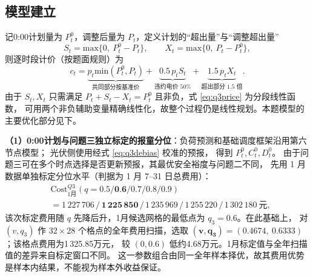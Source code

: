 \documentclass[withoutpreface,bwprint]{cumcmthesis}
\begin{document}
\subsection{模型建立}

记0:00计划量为 $P^0_t$，调整后量为 $P_t$，定义计划的“超出量”与“调整超出量”
\begin{equation}
S_t=\text{max}\{0,\ P^0_t-P_t\},\qquad X_t=\text{max}\{0,\ P_t-P^0_t\},
\label{eq:SX}
\end{equation}
则逐时段计价（按题面规则）为
\begin{equation}
c_t=\underbrace{p_t\text{min}(P^0_t,P_t)}_{\text{共同部分按基准价}}
+\underbrace{0.5\,p_t S_t}_{\text{违约电价 50\%}}
+\underbrace{1.5\,p_t X_t}_{\text{超出部分 1.5 倍}} .
\label{eq:q3price}
\end{equation}
由于 $S_t,X_t$ 只需满足 $P_t+S_t-X_t=P^0_t$ 且非负，式 \eqref{eq:q3price} 为分段线性函数，
可用两个非负辅助变量精确线性化，故整个过程仍是线性规划。本题模型的主要优化部分见下。

\textbf{（1）0:00计划与问题三独立标定的报童分位}：负荷预测和基础调度框架沿用第六节点模型；
光伏侧使用经式 \eqref{eq:q3debias} 校准的预报，
得到 $P^0_t,C^0_t,D^0_t$。
由于问题三可在多个时点选择是否更新预报，其最优安全裕度与问题二不同，
先用 1 月数据单独标定分位水平（判据为 1 月 7--31 日总费用）：
\begin{equation}
\begin{aligned}
&\mathrm{Cost}_{1\text{月}}^{Q3}(q=0.5/\textbf{0.6}/0.7/0.8/0.9)\\
&=1\,227\,706\,/\,\bm{1\,225\,850}\,/\,1\,235\,969\,/\,1\,255\,220\,/\,1\,302\,180\ \text{元},
\end{aligned}
\label{eq:qtune3}
\end{equation}
该次标定费用随 $q$ 先降后升，1月候选网格的最低点为 $q_3=0.6$。在此基础上，
对 $(v,q_3)$ 作 $32\times28$ 个格点的全年费用扫描，选取
$\bm{(v,q_3)=(0.4674,\ 0.6333)}$；该格点费用为1\,325.85万元，
较 $(0,0.6)$ 低约4.68万元。1月标定值与全年扫描值的差异来自标定窗口不同。
这一参数组合由同一全年样本择优，故其费用优势是样本内结果，不能视为样本外收益保证。
\end{document}
